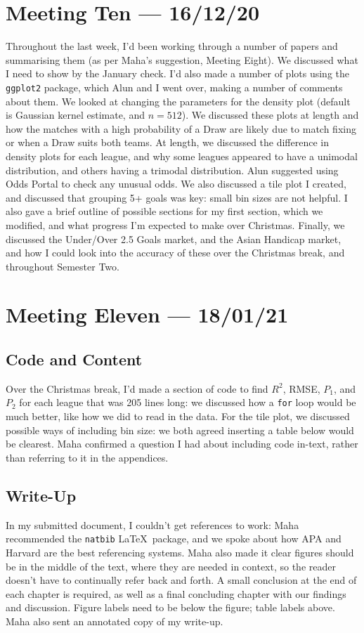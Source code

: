 \documentclass[a4paper,10pt]{report}
\begin{document}
\section*{Meeting Ten --- 16/12/20}
Throughout the last week, I'd been working through a number of papers and summarising them (as per Maha's suggestion, Meeting Eight). We discussed what I need to show by the January check. I'd also made a number of plots using the \lstinline|ggplot2| package, which Alun and I went over, making a number of comments about them. We looked at changing the parameters for the density plot (default is Gaussian kernel estimate, and $n=512$). We discussed these plots at length and how the matches with a high probability of a Draw are likely due to match fixing or when a Draw suits both teams. At length, we discussed the difference in density plots for each league, and why some leagues appeared to have a unimodal distribution, and others having a trimodal distribution. Alun suggested using Odds Portal to check any unusual odds. We also discussed a tile plot I created, and discussed that grouping 5+ goals was key: small bin sizes are not helpful. I also gave a brief outline of possible sections for my first section, which we modified, and what progress I'm expected to make over Christmas. Finally, we discussed the Under/Over 2.5 Goals market, and the Asian Handicap market, and how I could look into the accuracy of these over the Christmas break, and throughout Semester Two. 

\section*{Meeting Eleven --- 18/01/21}
\subsection*{Code and Content}
Over the Christmas break, I'd made a section of code to find $R^2$, RMSE, $P_1$, and $P_2$ for each league that was 205 lines long: we discussed how a \lstinline|for| loop would be much better, like how we did to read in the data. For the tile plot, we discussed possible ways of including bin size: we both agreed inserting a table below would be clearest. Maha confirmed a question I had about including code in-text, rather than referring to it in the appendices. 

\subsection*{Write-Up}
In my submitted document, I couldn't get references to work: Maha recommended the \lstinline|natbib| \LaTeX\ package, and we spoke about how APA and Harvard are the best referencing systems. Maha also made it clear figures should be in the middle of the text, where they are needed in context, so the reader doesn't have to continually refer back and forth. A small conclusion at the end of each chapter is required, as well as a final concluding chapter with our findings and discussion. Figure labels need to be below the figure; table labels above. Maha also sent an annotated copy of my write-up.
\end{document}

